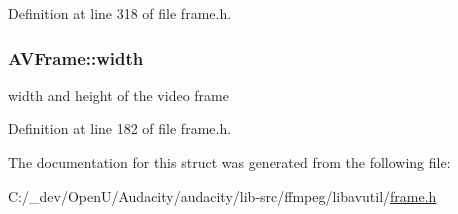 Definition at line 318 of file frame.\+h.

\subsubsection[{\texorpdfstring{width}{width}}]{ A\+V\+Frame\+::width}\hypertarget{struct_a_v_frame_a1e71ce60cedd5f3b6811714a9f7f9e0a}{}\label{struct_a_v_frame_a1e71ce60cedd5f3b6811714a9f7f9e0a}
width and height of the video frame 

Definition at line 182 of file frame.\+h.



The documentation for this struct was generated from the following file\+:\begin{DoxyCompactItemize}
\item 
C\+:/\+\_\+dev/\+Open\+U/\+Audacity/audacity/lib-\/src/ffmpeg/libavutil/\hyperlink{ffmpeg_2libavutil_2frame_8h}{frame.\+h}\end{DoxyCompactItemize}
